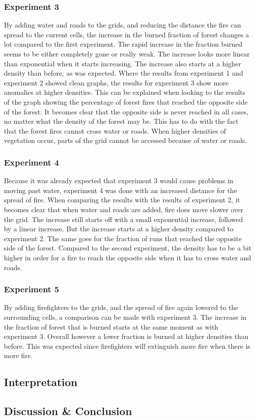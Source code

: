 \documentclass{article}
\begin{document}
\begin{multicols}{2}
\subsubsection*{Experiment 3}
By adding water and roads to the grids, and reducing the distance the fire can spread to the current cells, the increase in the burned fraction of forest changes a lot compared to the first experiment. The rapid increase in the fraction burned seems to be either completely gone or really weak. The increase looks more linear than exponential when it starts increasing. The increase also starts at a higher density than before, as was expected. Where the results from experiment 1 and experiment 2 showed clean graphs, the results for experiment 3 show more anomalies at higher densities. This can be explained when looking to the results of the graph showing the percentage of forest fires that reached the opposite side of the forest. It becomes clear that the opposite side is never reached in all cases, no matter what the density of the forest may be. This has to do with the fact that the forest fires cannot cross water or roads. When higher densities of vegetation occur, parts of the grid cannot be accessed because of water or roads.
\subsubsection*{Experiment 4}
Because it was already expected that experiment 3 would cause problems in moving past water, experiment 4 was done with an increased distance for the spread of fire. When comparing the results with the results of experiment 2, it becomes clear that when water and roads are added, fire does move slower over the grid. The increase still starts off with a small exponential increase, followed by a linear increase. But the increase starts at a higher density compared to experiment 2. The same goes for the fraction of runs that reached the opposite side of the forest. Compared to the second experiment, the density has to be a bit higher in order for a fire to reach the opposite side when it has to cross water and roads.
\subsubsection*{Experiment 5}
By adding firefighters to the grids, and the spread of fire again lowered to the surrounding cells, a comparison can be made with experiment 3. The increase in the fraction of forest that is burned starts at the same moment as with experiment 3. Overall however a lower fraction is burned at higher densities than before. This was expected since firefighters will extinguish more fire when there is more fire.
\subsection*{Interpretation}

\subsection*{Discussion \& Conclusion}

\nocite{*}


\end{multicols}
\end{document}
